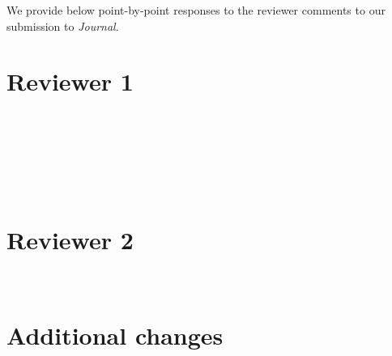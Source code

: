 \documentclass[paper = a4, DIV = 17, BCOR = 3mm, headings = small, parskip = never]{scrartcl}
\let\oldparagraph\paragraph
\renewcommand{\paragraph}[1]{\oldparagraph{#1}~\\}
\begin{document}
We provide below point-by-point responses to the reviewer comments to our submission to \emph{Journal}.

\section*{Reviewer 1}

\paragraph{\lipsum[1]}
\lipsum[2]

\paragraph{\lipsum[3]}
\lipsum[4]

\paragraph{\lipsum[5]}
\lipsum[6]

\section*{Reviewer 2}

\paragraph{\lipsum[7]}
\lipsum[8]

\section*{Additional changes}

\lipsum[9]
\end{document}
